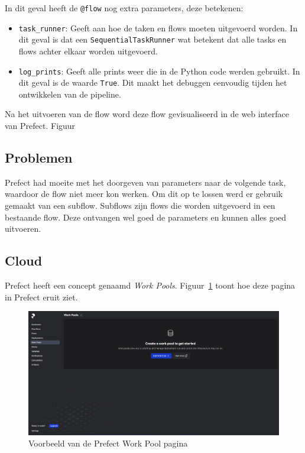 In dit geval heeft de \texttt{@flow} nog extra parameters, deze betekenen:

\begin{itemize}
    \item \texttt{task\_runner}: Geeft aan hoe de taken en flows moeten uitgevoerd worden. In dit geval is dat een \texttt{SequentialTaskRunner} wat betekent dat alle tasks en flows achter elkaar worden uitgevoerd.
    \item \texttt{log\_prints}: Geeft alle prints weer die in de Python code werden gebruikt. In dit geval is de waarde \texttt{True}. Dit maakt het debuggen eenvoudig tijden het ontwikkelen van de pipeline.
\end{itemize}

Na het uitvoeren van de flow word deze flow gevisualiseerd in de web interface van Prefect. Figuur %

\subsection{Problemen}

Prefect had moeite met het doorgeven van parameters naar de volgende task, waardoor de flow niet meer kon werken. Om dit op te lossen werd er gebruik gemaakt van een subflow. Subflows zijn flows die worden uitgevoerd in een bestaande flow. Deze ontvangen wel goed de parameters en kunnen alles goed uitvoeren.

\subsection{Cloud}

Prefect heeft een concept genaamd \textit{Work Pools}. Figuur~\ref{fig:Prefect_Work_Pools} toont hoe deze pagina in Prefect eruit ziet.

\begin{figure}
    \centering
    \includegraphics[width=0.9\linewidth]{graphics/Prefect_Work_Pools.PNG}
    \caption{Voorbeeld van de Prefect Work Pool pagina}
    \label{fig:Prefect_Work_Pools}
\end{figure}

